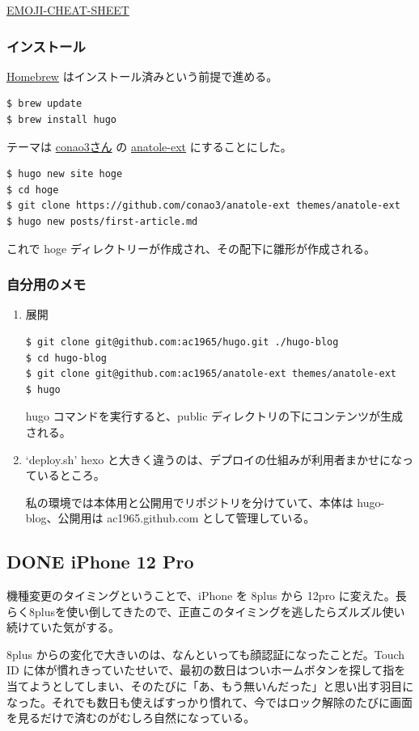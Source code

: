 \documentclass[11pt]{article}
\begin{document}
\href{https://www.webfx.com/tools/emoji-cheat-sheet/}{EMOJI-CHEAT-SHEET}
\subsubsection{インストール}
\label{sec:org6e8c2a2}
\href{https://brew.sh/index\_ja}{Homebrew} はインストール済みという前提で進める。
\begin{verbatim}
$ brew update
$ brew install hugo
\end{verbatim}
テーマは \href{https://conao3.com}{conao3さん} の \href{https://github.com/conao3/anatole-ext}{anatole-ext} にすることにした。
\begin{verbatim}
$ hugo new site hoge
$ cd hoge
$ git clone https://github.com/conao3/anatole-ext themes/anatole-ext
$ hugo new posts/first-article.md
\end{verbatim}
これで hoge ディレクトリーが作成され、その配下に雛形が作成される。
\subsubsection{自分用のメモ}
\label{sec:org9c7b4b8}
\begin{enumerate}
\item 展開
\label{sec:org03c6d08}
\begin{verbatim}
$ git clone git@github.com:ac1965/hugo.git ./hugo-blog
$ cd hugo-blog
$ git clone git@github.com:ac1965/anatole-ext themes/anatole-ext
$ hugo
\end{verbatim}
hugo コマンドを実行すると、public ディレクトリの下にコンテンツが生成される。
\item `deploy.sh'
\label{sec:org303251a}
hexo と大きく違うのは、デプロイの仕組みが利用者まかせになっているところ。

私の環境では本体用と公開用でリポジトリを分けていて、本体は hugo-blog、公開用は ac1965.github.com として管理している。
\end{enumerate}
\subsection{{\bfseries\sffamily DONE} iPhone 12 Pro}
\label{sec:org6ad6552}
機種変更のタイミングということで、iPhone を 8plus から 12pro に変えた。長らく8plusを使い倒してきたので、正直このタイミングを逃したらズルズル使い続けていた気がする。

8plus からの変化で大きいのは、なんといっても顔認証になったことだ。Touch ID に体が慣れきっていたせいで、最初の数日はついホームボタンを探して指を当てようとしてしまい、そのたびに「あ、もう無いんだった」と思い出す羽目になった。それでも数日も使えばすっかり慣れて、今ではロック解除のたびに画面を見るだけで済むのがむしろ自然になっている。
\end{document}
